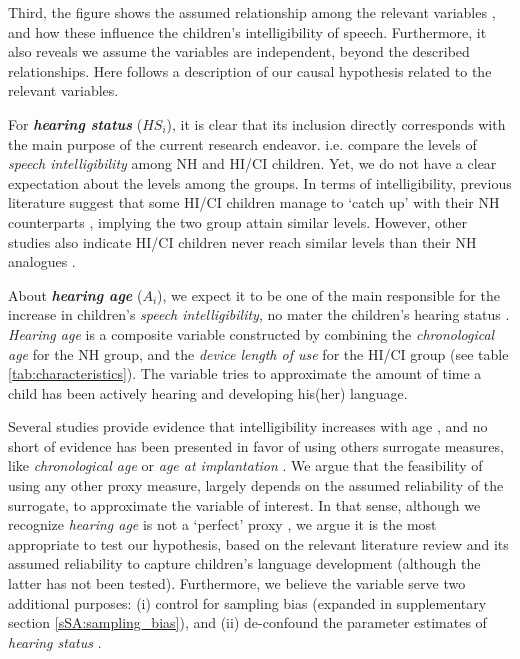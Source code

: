 Third, the figure shows the assumed relationship among the relevant variables \cite{Niparko_et_al_2010, Boons_et_al_2012, Gillis_2018, Fagan_et_al_2020}, and how these influence the children's intelligibility of speech. Furthermore, it also reveals we assume the variables are independent, beyond the described relationships. Here follows a description of our causal hypothesis related to the relevant variables.

For \textbf{\textit{hearing status}} ($HS_{i}$), it is clear that its inclusion directly corresponds with the main purpose of the current research endeavor. i.e. compare the levels of \textit{speech intelligibility} among NH and HI/CI children. Yet, we do not have a clear expectation about the levels among the groups. In terms of intelligibility, previous literature suggest that some HI/CI children manage to `catch up' with their NH counterparts \cite{Wie_2010, Habib_et_al_2010, Boons_et_al_2013, Geers_et_al_2013, Bruijnzeel_et_al_2016, Dettman_et_al_2016, Wie_et_al_2020}, implying the two group attain similar levels. However, other studies also indicate HI/CI children never reach similar levels than their NH analogues \cite{Nicholas_et_al_2007, Castellanos_et_al_2014, Chin_et_al_2014, Geers_et_al_2016, Freeman_et_al_2017, Duchesne_et_al_2019, Grandon_et_al_2020}. 

About \textbf{\textit{hearing age}} ($A_{i}$), we expect it to be one of the main responsible for the increase in children's \textit{speech intelligibility}, no mater the children's hearing status \cite{Boonen_et_al_2021}. \textit{Hearing age} is a composite variable constructed by combining the \textit{chronological age} for the NH group, and the \textit{device length of use} for the HI/CI group \citep{Faes_et_al_2021} (see table \ref{tab:characteristics}). The variable tries to approximate the amount of time a child has been actively hearing and developing his(her) language. 

Several studies provide evidence that intelligibility increases with age \cite{Chin_et_al_2001, Chin_et_al_2003, Flipsen_2006, Flipsen_2008, Baudonck_et_al_2009, Bowen_2011, Hustad_et_al_2020}, and no short of evidence has been presented in favor of using others surrogate measures, like \textit{chronological age} \cite{Flipsen_et_al_2006, Habib_et_al_2010, Grandon_et_al_2020} or \textit{age at implantation} \cite{Niparko_et_al_2010, Boons_et_al_2012, Bruijnzeel_et_al_2016, Dettman_et_al_2016}. We argue that the feasibility of using any other proxy measure, largely depends on the assumed reliability of the surrogate, to approximate the variable of interest. In that sense, although we recognize \textit{hearing age} is not a `perfect' proxy \cite{Faes_et_al_2021}, we argue it is the most appropriate to test our hypothesis, based on the relevant literature review and its assumed reliability to capture children's language development (although the latter has not been tested). Furthermore, we believe the variable serve two additional purposes: (i) control for sampling bias (expanded in supplementary section \ref{sSA:sampling_bias}), and (ii) de-confound the parameter estimates of \textit{hearing status} \cite{Cinelli_et_al_2021}.

